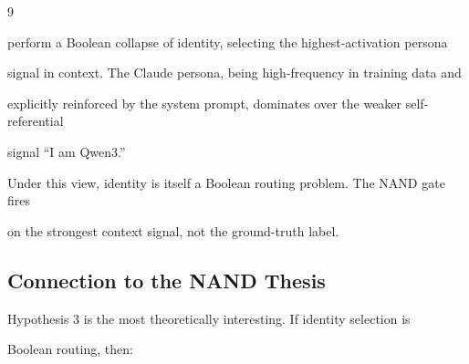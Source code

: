 \documentclass[11pt]{article}
\theoremstyle{definition}
\begin{document}
\begin{thebibliography}{9}
\begin{enumerate}
perform a Boolean collapse of identity, selecting the highest-activation persona





signal in context. The Claude persona, being high-frequency in training data and





explicitly reinforced by the system prompt, dominates over the weaker self-referential





signal ``I am Qwen3.''











Under this view, identity is itself a Boolean routing problem. The NAND gate fires





on the strongest context signal, not the ground-truth label.











\end{enumerate}











\subsection{Connection to the NAND Thesis}











Hypothesis 3 is the most theoretically interesting. If identity selection is





Boolean routing, then:












\end{thebibliography}
\end{document}

